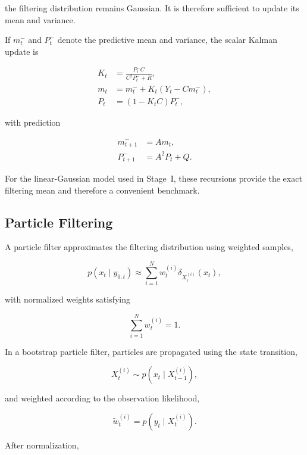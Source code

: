 the filtering distribution remains Gaussian. It is therefore sufficient
to update its mean and variance.

If \(m_t^{-}\) and \(P_t^{-}\) denote the predictive mean and variance,
the scalar Kalman update is

\begin{align}
	K_t &=
	\frac{P_t^- C}{C^2P_t^-+R}, \\
	m_t &=
	m_t^- + K_t(Y_t-Cm_t^-), \\
	P_t &=
	(1-K_tC)P_t^-,
\end{align}

with prediction

\begin{align}
	m_{t+1}^- &= A m_t, \\
	P_{t+1}^- &= A^2P_t + Q.
\end{align}

For the linear-Gaussian model used in Stage~I, these recursions provide
the exact filtering mean and therefore a convenient benchmark.


\subsection{Particle Filtering}
\label{subsec:particle-filtering}

A particle filter approximates the filtering distribution using weighted
samples,

\begin{equation}
	p(x_t\mid y_{0:t})
	\approx
	\sum_{i=1}^{N}
	w_t^{(i)}
	\delta_{X_t^{(i)}}(x_t),
\end{equation}

with normalized weights satisfying

\begin{equation}
	\sum_{i=1}^{N} w_t^{(i)} = 1.
\end{equation}

In a bootstrap particle filter, particles are propagated using the state
transition,

\begin{equation}
	X_t^{(i)}
	\sim
	p(x_t\mid X_{t-1}^{(i)}),
\end{equation}

and weighted according to the observation likelihood,

\begin{equation}
	\widetilde{w}_t^{(i)}
	=
	p(y_t\mid X_t^{(i)}).
\end{equation}

After normalization,

